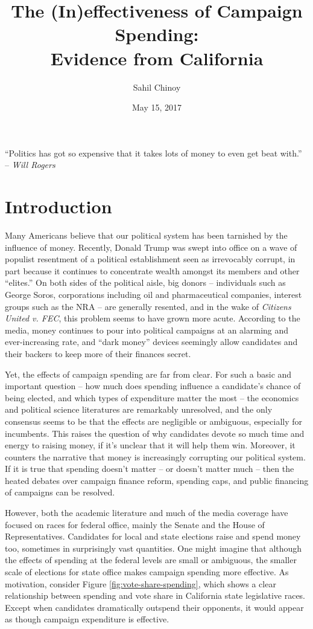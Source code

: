 \documentclass{article}
\title{The (In)effectiveness of Campaign Spending: \\ Evidence from California}
\author{Sahil Chinoy}
\date{May 15, 2017}
\begin{document}
\maketitle{}

\begin{displayquote}
``Politics has got so expensive that it takes lots of money to even get beat with.'' \\ -- \textit{Will Rogers}
\end{displayquote}

\section{Introduction}

Many Americans believe that our political system has been tarnished by the influence of money. Recently, Donald Trump was swept into office on a wave of populist resentment of a political establishment seen as irrevocably corrupt, in part because it continues to concentrate wealth amongst its members and other ``elites.'' On both sides of the political aisle, big donors -- individuals such as George Soros, corporations including oil and pharmaceutical companies, interest groups such as the NRA -- are generally resented, and in the wake of \textit{Citizens United v. FEC}, this problem seems to have grown more acute. According to the media, money continues to pour into political campaigns at an alarming and ever-increasing rate, and ``dark money'' devices seemingly allow candidates and their backers to keep more of their finances secret.

Yet, the effects of campaign spending are far from clear. For such a basic and important question -- how much does spending influence a candidate's chance of being elected, and which types of expenditure matter the most -- the economics and political science literatures are remarkably unresolved, and the only consensus seems to be that the effects are negligible or ambiguous, especially for incumbents. This raises the question of why candidates devote so much time and energy to raising money, if it's unclear that it will help them win. Moreover, it counters the narrative that money is increasingly corrupting our political system. If it is true that spending doesn't matter -- or doesn't matter much -- then the heated debates over campaign finance reform, spending caps, and public financing of campaigns can be resolved.

However, both the academic literature and much of the media coverage have focused on races for federal office, mainly the Senate and the House of Representatives. Candidates for local and state elections raise and spend money too, sometimes in surprisingly vast quantities. One might imagine that although the effects of spending at the federal levels are small or ambiguous, the smaller scale of elections for state office makes campaign spending more effective. As motivation, consider Figure \ref{fig:vote-share-spending}, which shows a clear relationship between spending and vote share in California state legislative races. Except when candidates dramatically outspend their opponents, it would appear as though campaign expenditure is effective.
\end{document}
